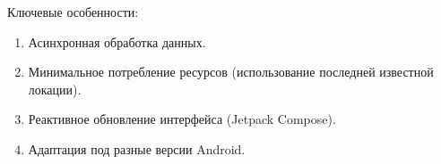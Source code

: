 Ключевые особенности:

\begin{enumerate}
    \item Асинхронная обработка данных.
    \item Минимальное потребление ресурсов (использование последней известной локации).
    \item Реактивное обновление интерфейса (Jetpack Compose).
    \item Адаптация под разные версии Android.
\end{enumerate}